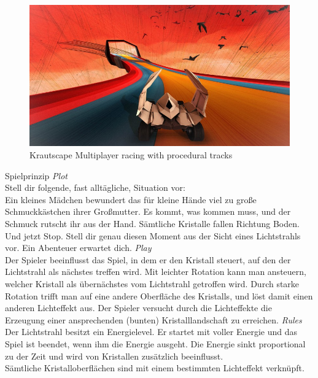 {
	\begin{figure}
		\centering
		\includegraphics[width=\textwidth, height=0.7\textheight, keepaspectratio]{images/krautscape_ks1}
		\caption{Krautscape \linebreak Multiplayer racing with procedural tracks}
	\end{figure}
}

\slideonetoonetoone
{Spielprinzip}
{
	\emph{Plot}\\
	Stell dir folgende, fast alltägliche, Situation vor:\\
	Ein kleines Mädchen bewundert das für kleine Hände viel zu große Schmuckkästchen ihrer Großmutter. Es kommt, was kommen muss, und der Schmuck rutscht ihr aus der Hand. Sämtliche Kristalle fallen Richtung Boden. Und jetzt Stop. Stell dir genau diesen Moment aus der Sicht eines Lichtstrahls vor. Ein Abenteuer erwartet dich.
}
{
	\pause
	\emph{Play}\\
	Der Spieler beeinflusst das Spiel, in dem er den Kristall steuert, auf den der Lichtstrahl als nächstes treffen wird. Mit leichter Rotation kann man ansteuern, welcher Kristall als übernächstes vom Lichtstrahl getroffen wird. Durch starke Rotation trifft man auf eine andere Oberfläche des Kristalls, und löst damit einen anderen Lichteffekt aus. Der Spieler versucht durch die Lichteffekte die Erzeugung einer ansprechenden (bunten) Kristalllandschaft zu erreichen.
}
{
	\pause
	\emph{Rules}\\
	Der Lichtstrahl besitzt ein Energielevel. Er startet mit voller Energie und das Spiel ist beendet, wenn ihm die Energie ausgeht. Die Energie sinkt proportional zu der Zeit und wird von Kristallen zusätzlich beeinflusst.\\
	Sämtliche Kristalloberflächen sind mit einem bestimmten Lichteffekt verknüpft.
}

